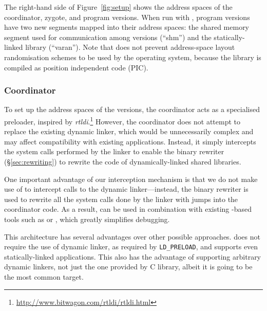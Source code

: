 The right-hand side of Figure~\ref{fig:setup} shows the address spaces
of the coordinator, zygote, and program versions.  When run with
\varan, program versions have two new segments mapped into their
address spaces: the shared memory segment used for communication among
versions (``shm'') and the \varan statically-linked library
(``varan'').  Note that \varan does not prevent address-space layout
randomisation schemes to be used by the operating system, because the
\varan library is compiled as position independent code (PIC).



\subsubsection{Coordinator}

To set up the address spaces of the versions, the coordinator acts as a
specialised preloader, inspired by
\emph{rtldi}.\footnote{\url{http://www.bitwagon.com/rtldi/rtldi.html}} However,
the coordinator does not attempt to replace the existing dynamic linker, which
would be unnecessarily complex and may affect compatibility with existing
applications. Instead, it simply intercepts the system calls performed by the
linker to enable the binary rewriter (\S\ref{sec:rewriting}) to rewrite the
code of dynamically-linked shared libraries.

One important advantage of our interception mechanism is that we do not make
use of \ptrace to intercept calls to the dynamic linker---instead, the binary
rewriter is used to rewrite all the system calls done by the linker with jumps
into the coordinator code.  As a result, \varan can be used in combination with
existing \ptrace-based tools such as \gdb or \strace, which greatly simplifies
debugging.

This architecture has several advantages over other possible approaches. \varan
does not require the use of dynamic linker, as required by
\lstinline`LD_PRELOAD`, and supports even statically-linked applications.
This also has the advantage of supporting arbitrary dynamic linkers, not just
the one provided by \gnu C library, albeit it is going to be the most common
target.

